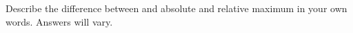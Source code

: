{Describe the difference between and absolute and relative maximum in your own words.
}
{Answers will vary.
}
